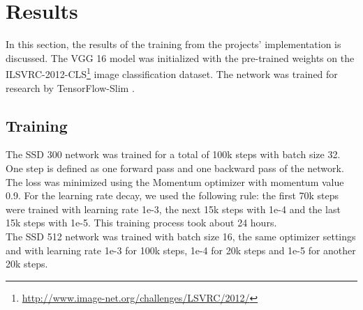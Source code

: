 
\section{Results}
\label{section:results}

In this section, the results of the training from the projects' implementation is discussed. The VGG 16 model was initialized with the pre-trained weights on the ILSVRC-2012-CLS\footnote{\url{http://www.image-net.org/challenges/LSVRC/2012/}} image classification dataset. The network was trained for research by TensorFlow-Slim \cite{slimmodels}.

\subsection{Training}

The SSD 300 network was trained for a total of 100k steps with batch size 32. One step is defined as one forward pass and one backward pass of the network. The loss was minimized using the Momentum optimizer with momentum value 0.9. For the learning rate decay, we used the following rule: the first 70k steps were trained with learning rate 1e-3, the next 15k steps with 1e-4 and the last 15k steps with 1e-5. This training process took about 24 hours. \\

The SSD 512 network was trained with batch size 16, the same optimizer settings and with learning rate 1e-3 for 100k steps, 1e-4 for 20k steps and 1e-5 for another 20k steps.

\bgroup
\vspace{\abovedisplayskip}
\begin{minipage}{0.5\textwidth}
\end{minipage}
\begin{minipage}{0.5\textwidth}
\end{minipage}
\vspace{\belowdisplayskip}
\egroup

